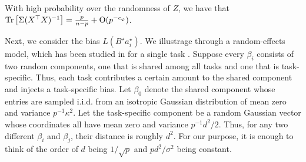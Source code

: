 \begin{fact}\label{fact_tr}
	With high probability over the randomness of $Z$, we have that $\operatorname{Tr}\left[\Sigma (X^{\top} X)^{-1}\right] = \frac{p}{n - p} + \operatorname{O}(p^{-c_{\varphi}})$.
\end{fact}


Next, we consider the bias $L(B^{\star} a^{\star}_i)$.
We illustrage through a random-effects model, which has been studied in for a single task \cite{dobriban2020wonder}.
Suppose every $\beta_i$ consists of two random components, one that is shared among all tasks and one that is task-specific.
Thus, each task contributes a certain amount to the shared component and injects a task-specific bias.
Let $\beta_0$ denote the shared component whose entries are sampled i.i.d. from an isotropic Gaussian distribution of mean zero and variance $p^{-1}\kappa^2$.
Let the task-specific component be a random Gaussian vector whose coordinates all have mean zero and variance $p^{-1} d^2 / 2$.
Thus, for any two different $\beta_i$ and $\beta_j$, their distance is roughly $d^2$.
For our purpose, it is enough to think of the order of $d$ being $1/\sqrt{p}$ and $pd^2/\sigma^2$ being constant.

